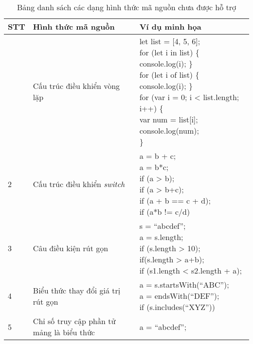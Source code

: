 \begin{longtable}{ |p{1cm}|p{7cm}|p{}|}
    \caption{Bảng danh sách các dạng hình thức mã nguồn chưa được hỗ trợ}
    \\
         \hline
         \textbf{STT} & \textbf{Hình thức mã nguồn} & \textbf{Ví dụ minh họa}\\
         \hline
         \endhead
         \hline
         \endfoot
        1 & Cấu trúc điều khiển vòng lặp & \makecell[l]{let list = [4, 5, 6];\\
        for (let i in list) \{ console.log(i); \}\\
        for (let i of list) \{ console.log(i); \}\\
        for (var i = 0; i < list.length; i++) \{\\
            var num = list[i];\\
            console.log(num);\\
        \}
        } \\
        \hline
        2 & Cấu trúc điều khiển \textit{switch}   & \makecell[l]{ a = b + c;\\ a = b*c;\\
        if (a > b); \\if (a > b+c); \\
        if (a + b ==  c + d); \\
        if (a*b != c/d)}
        \\
        \hline
        3 & Câu điều kiện rút gọn & \makecell[l]{ s = “abcdef”;\\
        a = s.length;\\
        if (s.length > 10);\\
        if(s.length > a+b); \\
        if (s1.length < s2.length + a);}
        \\
        \hline
        4 & Biểu thức thay đổi giá trị rút gọn & \makecell[l]{ a = s.startsWith(“ABC”); \\
        a = endsWith(“DEF”);\\
        if (s.includes(“XYZ”))}
        \\
        \hline
        5 & Chỉ số truy cập phần tử mảng là biểu thức & a = “abcdef”;\\

\end{longtable}
